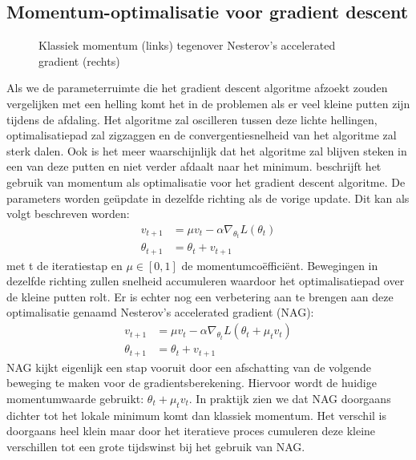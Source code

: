 \subsection{Momentum-optimalisatie voor gradient descent}
\begin{figure}[!t]
	\centering
	\def\svgwidth{0.6\columnwidth}
	
	\caption{Klassiek momentum (links) tegenover Nesterov's accelerated gradient (rechts) \cite{sutskever2013importance}}
	\label{fig:momentum}
\end{figure}
Als we de parameterruimte die het gradient descent algoritme afzoekt zouden vergelijken met een helling komt het in de problemen als er veel kleine putten zijn tijdens de afdaling. Het algoritme zal oscilleren tussen deze lichte hellingen, optimalisatiepad zal zigzaggen en de convergentiesnelheid van het algoritme zal sterk dalen. Ook is het meer waarschijnlijk dat het algoritme zal blijven steken in een van deze putten en niet verder afdaalt naar het minimum.
\npar \cite{botev_nesterovs_2016} beschrijft het gebruik van momentum als optimalisatie voor het gradient descent algoritme. De parameters worden ge\"update in dezelfde richting als de vorige update. Dit kan als volgt beschreven worden:
\begin{equation}
\begin{aligned}
v_{t+1} &= \mu v_{t} - \alpha\nabla_{\theta_t} L(\theta_{t})\\
\theta_{t+1} &= \theta_t + v_{t+1}
\end{aligned}
\end{equation}
met t de iteratiestap en $\mu \in[0,1]$ de momentumco\"effici\"ent. Bewegingen in dezelfde richting zullen snelheid accumuleren waardoor het optimalisatiepad over de kleine putten rolt. Er is echter nog een verbetering aan te brengen aan deze optimalisatie genaamd Nesterov's accelerated gradient (NAG):
\begin{equation}
\begin{aligned}
v_{t+1} &= \mu v_t - \alpha\nabla_{\theta_t} L(\theta_{t}+\mu_tv_t)\\
\theta_{t+1} &= \theta_t + v_{t+1}
\end{aligned}
\end{equation}
\npar NAG kijkt eigenlijk een stap vooruit door een afschatting van de volgende beweging te maken voor de gradientsberekening. Hiervoor wordt de huidige momentumwaarde gebruikt: $\theta_{t}+\mu_tv_t$.  In praktijk zien we dat NAG doorgaans dichter tot het lokale minimum komt dan klassiek momentum. Het verschil is doorgaans heel klein maar door het iteratieve proces cumuleren deze kleine verschillen tot een grote tijdswinst bij het gebruik van NAG.


